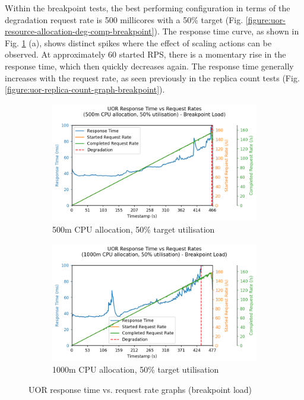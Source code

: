 Within the breakpoint tests, the best performing configuration in terms of the degradation request rate is 500 millicores with a 50\% target (Fig. \ref{figure:uor-resource-allocation-deg-comp-breakpoint}). The response time curve, as shown in Fig. \ref{figure:uor-resource-allocation-rt-graph-i2-i6-breakpoint} (a), shows distinct spikes where the effect of scaling actions can be observed. At approximately 60 started RPS, there is a momentary rise in the response time, which then quickly decreases again. The response time generally increases with the request rate, as seen previously in the replica count tests (Fig. \ref{figure:uor-replica-count-graph-breakpoint}).

\begin{figure}[h]
    \centering
    \begin{subfigure}{.5\textwidth}
      \centering
      \includegraphics[width=\linewidth]{figures/uor-rau-i2-rt-graph-breakpoint.png}
      \caption{500m CPU allocation, 50\% target utilisation}
    \end{subfigure}%
    \begin{subfigure}{.5\textwidth}
      \centering
      \includegraphics[width=\linewidth]{figures/uor-rau-i6-rt-graph-breakpoint.png}
      \caption{1000m CPU allocation, 50\% target utilisation}
    \end{subfigure}

    \caption{UOR response time vs. request rate graphs (breakpoint load)}
    \label{figure:uor-resource-allocation-rt-graph-i2-i6-breakpoint}
\end{figure}

